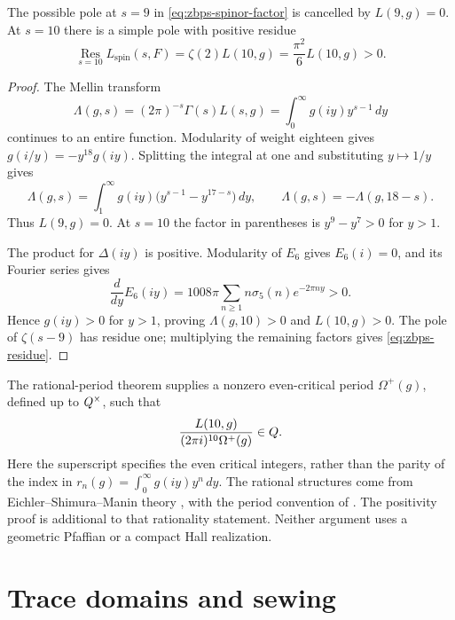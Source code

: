 \begin{proposition}[The pole at \(s=10\)]
\label{prop:zbps-spin-pole-residue}
The possible pole at \(s=9\) in \eqref{eq:zbps-spinor-factor}
is cancelled by \(L(9,g)=0\).  At \(s=10\) there is a simple
pole with positive residue
\begin{equation}\label{eq:zbps-residue}
 \operatorname*{Res}_{s=10}L_{\mathrm{spin}}(s,F)
 =\zeta(2)L(10,g)=\frac{\pi^2}{6}L(10,g)>0.
\end{equation}
\end{proposition}
\begin{proof}
The Mellin transform
\[
 \Lambda(g,s)=(2\pi)^{-s}\Gamma(s)L(s,g)
             =\int_0^\infty g(iy)y^{s-1}\,dy
\]
continues to an entire function.  Modularity of weight eighteen
gives \(g(i/y)=-y^{18}g(iy)\).  Splitting the integral at one
and substituting \(y\mapsto1/y\) gives
\[
 \Lambda(g,s)=\int_1^\infty
        g(iy)\bigl(y^{s-1}-y^{17-s}\bigr)\,dy,
 \qquad\Lambda(g,s)=-\Lambda(g,18-s).
\]
Thus \(L(9,g)=0\).  At \(s=10\) the factor in parentheses is
\(y^9-y^7>0\) for \(y>1\).

The product for \(\Delta(iy)\) is positive.  Modularity of
\(E_6\) gives \(E_6(i)=0\), and its Fourier series gives
\[
 \frac{d}{dy}E_6(iy)=1008\pi
       \sum_{n\ge1}n\sigma_5(n)e^{-2\pi ny}>0.
\]
Hence \(g(iy)>0\) for \(y>1\), proving
\(\Lambda(g,10)>0\) and \(L(10,g)>0\).
The pole of \(\zeta(s-9)\) has residue one; multiplying the
remaining factors gives \eqref{eq:zbps-residue}.
\end{proof}

The rational-period theorem supplies a nonzero even-critical
period \(\Omega^+(g)\), defined up to \(Q^\times\), such that
\[
 \frac{L(10,g)}{(2\pi i)^{10}\Omega^+(g)}\in Q.
\]
Here the superscript specifies the even critical integers, rather
than the parity of the index in
\(r_n(g)=\int_0^\infty g(iy)y^n\,dy\).
The rational structures come from Eichler--Shimura--Manin theory
\cite{Manin72,KZ}, with the period convention of \cite{Del79}.
The positivity proof is additional to that rationality statement.
Neither argument uses a geometric Pfaffian or a compact Hall
realization.

\section{Trace domains and sewing}
\label{sec:scalar-trace-not-gravity}


